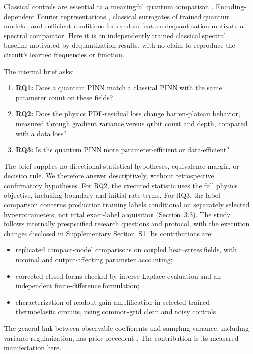 \documentclass[11pt]{article}
\begin{document}
Classical controls are essential to a meaningful quantum comparison
\citep{Bowles2024}. Encoding-dependent Fourier representations
\citep{Schuld2021}, classical surrogates of trained quantum models
\citep{Schreiber2023}, and sufficient conditions for random-feature
dequantization \citep{Sahebi2025} motivate a spectral comparator. Here it is
an independently trained classical spectral baseline motivated by
dequantization results, with no claim to reproduce the circuit's learned
frequencies or function.

The internal brief asks:
\begin{enumerate}
\item \textbf{RQ1:} Does a quantum PINN match a classical PINN with the same
parameter count on these fields?
\item \textbf{RQ2:} Does the physics PDE-residual loss change barren-plateau
behavior, measured through gradient variance versus qubit count and depth,
compared with a data loss?
\item \textbf{RQ3:} Is the quantum PINN more parameter-efficient or
data-efficient?
\end{enumerate}
The brief supplies no directional statistical hypotheses, equivalence
margin, or decision rule. We therefore answer descriptively, without
retrospective confirmatory hypotheses. For RQ2, the executed statistic uses
the full physics objective, including boundary and initial-rate terms.
For RQ3, the label comparison concerns production training labels
conditional on separately selected hyperparameters, not total exact-label
acquisition (Section~3.3).
The study follows internally prespecified research questions and protocol,
with the execution changes disclosed in Supplementary Section~S1.
Its contributions are:
\begin{itemize}
\item replicated compact-model comparisons on coupled heat--stress fields,
with nominal and output-affecting parameter accounting;
\item corrected closed forms checked by inverse-Laplace evaluation and an
independent finite-difference formulation;
\item characterization of readout-gain amplification in selected trained
thermoelastic circuits, using common-grid clean and noisy controls.
\end{itemize}
The general link between observable coefficients and sampling variance,
including variance regularization, has prior precedent
\citep{Kreplin2024}. The contribution is its measured manifestation here.
\end{document}
